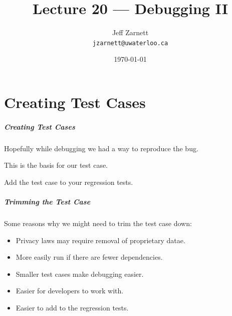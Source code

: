 
\usepackage{alltt}

\title{Lecture 20 --- Debugging II }

\author{Jeff Zarnett \\ \small \texttt{jzarnett@uwaterloo.ca}}
\date{\today}



\begin{frame}
  \titlepage

\end{frame}

\part{Creating Test Cases}
\frame{\partpage}

\begin{frame}
\frametitle{Creating Test Cases}
\begin{changemargin}{1cm}

Hopefully while debugging we had a way to reproduce the bug.

This is the basis for our test case.

Add the test case to your regression tests.

\end{changemargin}
\end{frame}

\begin{frame}
\frametitle{Trimming the Test Case}
\begin{changemargin}{1cm}

Some reasons why we might need to trim the test case down:

\begin{itemize}
	\item Privacy laws may require removal of proprietary datae.
	\item More easily run if there are fewer dependencies.
	\item Smaller test cases make debugging easier.
	\item Easier for developers to work with.
	\item Easier to add to the regression tests.
\end{itemize}

\end{changemargin}
\end{frame}

